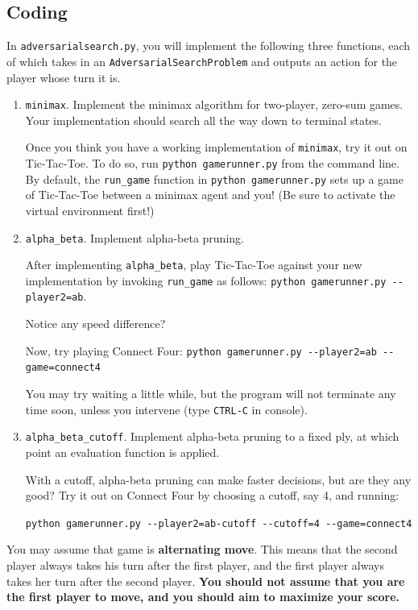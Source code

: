 \documentclass{article}
\begin{document}
\subsection{Coding}
In \verb|adversarialsearch.py|, you will implement the following three functions,
each of which takes in an \verb|AdversarialSearchProblem| and outputs an action for the player whose turn it is.

\begin{enumerate}
\item \verb|minimax|. Implement the minimax algorithm for two-player, zero-sum games.
  Your implementation should search all the way down to terminal states.

  Once you think you have a working implementation of \verb|minimax|, try it out on Tic-Tac-Toe.
  To do so, run \verb|python gamerunner.py| from the command line.
  By default, the \verb|run_game| function in \verb|python gamerunner.py|
  sets up a game of Tic-Tac-Toe between a minimax agent and you!
  (Be sure to activate the virtual environment first!)

\item \verb|alpha_beta|. Implement alpha-beta pruning.

  After implementing \verb|alpha_beta|,
  play Tic-Tac-Toe against your new implementation by invoking \verb|run_game| as follows:
  \verb|python gamerunner.py --player2=ab|.

  Notice any speed difference?

  Now, try playing Connect Four:
  \verb|python gamerunner.py --player2=ab --game=connect4|

  You may try waiting a little while, but the program will not terminate any time soon, unless you intervene
  (type \verb|CTRL-C| in console).

\item \verb|alpha_beta_cutoff|. Implement alpha-beta pruning to a fixed ply, at which point an
  evaluation function is applied.

  With a cutoff, alpha-beta pruning can make faster decisions, but are they any good?
  Try it out on Connect Four by choosing a cutoff, say 4, and running:

  \verb|python gamerunner.py --player2=ab-cutoff --cutoff=4 --game=connect4|
\end{enumerate}

You may assume that game is \textbf{alternating move}. This means that the second player always
takes his turn after the first player, and the first player always takes her turn after the second
player. \textbf{You should not assume that you are the first player to move, and you should aim
to maximize your score.}
\end{document}
